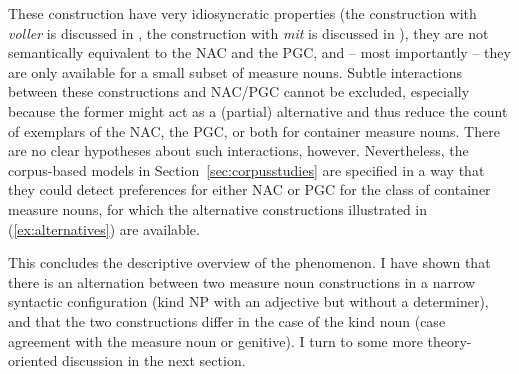 \documentclass[USenglish]{article}
\begin{document}
\begin{exe}
  \ex\label{ex:alternatives}
  \begin{xlist}
  \end{xlist}
\end{exe}

These construction have very idiosyncratic properties (the construction with \textit{voller} is discussed in \citealp{Zeldes2018}, the construction with \textit{mit} is discussed in \citealp{Bhatt1990}), they are not semantically equivalent to the NAC and the PGC, and -- most importantly -- they are only available for a small subset of measure nouns.
Subtle interactions between these constructions and NAC\slash PGC cannot be excluded, especially because the former might act as a (partial) alternative and thus reduce the count of exemplars of the NAC, the PGC, or both for container measure nouns.
There are no clear hypotheses about such interactions, however.
Nevertheless, the corpus-based models in Section~\ref{sec:corpusstudies} are specified in a way that they could detect preferences for either NAC or PGC for the class of container measure nouns, for which the alternative constructions illustrated in (\ref{ex:alternatives}) are available.

This concludes the descriptive overview of the phenomenon.
I have shown that there is an alternation between two measure noun constructions in a narrow syntactic configuration (kind NP with an adjective but without a determiner), and that the two constructions differ in the case of the kind noun (case agreement with the measure noun or genitive).
I turn to some more theory-oriented discussion in the next section.


\end{document}
